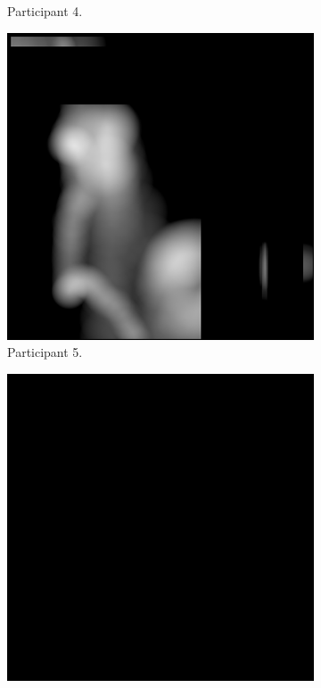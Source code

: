 \begin{figure}[!ht]
\begin{subfigure}[b]{0.24\textwidth}
        \caption{Participant 4.}
    \end{subfigure}
    \hfill
    \begin{subfigure}[b]{0.24\textwidth}
        \centering
        \includegraphics[width=\textwidth]{img/data/Panel14/single/5.png}
        \caption{Participant 5.}
    \end{subfigure}
    \hfill    
    \begin{subfigure}[b]{0.24\textwidth}
        \centering
        \includegraphics[width=\textwidth]{img/data/Panel14/single/6.png}

\end{subfigure}
\end{figure}
